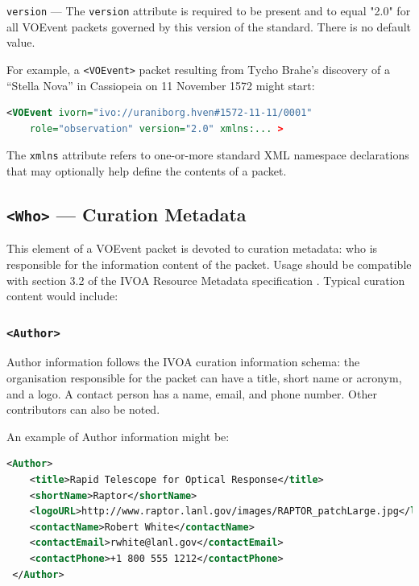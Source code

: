 \documentclass[11pt,a4paper]{ivoa}
\begin{document}
 {\tt version} \label{sec:3.1.3} --- 
The {\tt version} attribute is required to be present and to equal "2.0" for 
all VOEvent packets governed by this version of the standard. There is no 
default value. 

For example, a {\tt <VOEvent>} packet resulting from Tycho Brahe's discovery of 
a ``Stella Nova'' in Cassiopeia on 11 November 1572 might start: 
\begin{lstlisting}[language=XML]
<VOEvent ivorn="ivo://uraniborg.hven#1572-11-11/0001" 
    role="observation" version="2.0" xmlns:... >
\end{lstlisting}

The {\tt xmlns} attribute refers to one-or-more standard XML namespace 
declarations that may optionally help define the contents of a packet. 

\subsection{{\tt <Who>} --- Curation Metadata}
\label{sec:3.2}
This element of a VOEvent packet is devoted to curation metadata: who is 
responsible for the information content of the packet. Usage should be 
compatible with section 3.2 of the IVOA Resource Metadata specification 
\citep{2007ivoa.spec.0302H}. Typical curation content would include: 

\subsubsection{\tt <Author>}
Author information follows the IVOA curation information schema: the 
organisation responsible for the packet can have a title, short name or acronym,
and a logo. A contact person has a name, email, and phone number. Other 
contributors can also be noted. 

An example of Author information might be: 
\begin{lstlisting}[language=XML]
<Author>
    <title>Rapid Telescope for Optical Response</title>
    <shortName>Raptor</shortName>     
    <logoURL>http://www.raptor.lanl.gov/images/RAPTOR_patchLarge.jpg</logoURL>     
    <contactName>Robert White</contactName>     
    <contactEmail>rwhite@lanl.gov</contactEmail>
    <contactPhone>+1 800 555 1212</contactPhone>
 </Author> 
\end{lstlisting}
\end{document}
